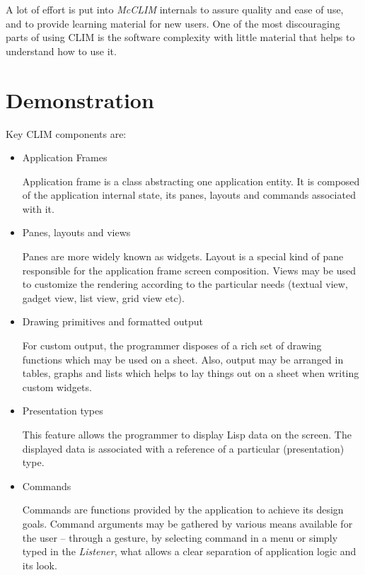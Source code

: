 \documentclass{sig-alternate-05-2015}
\begin{document}
A lot of effort is put into \emph{McCLIM} internals to assure quality
and ease of use, and to provide learning material for new users. One
of the most discouraging parts of using CLIM is the software
complexity with little material that helps to understand how to use
it.
\section{Demonstration}

Key CLIM components are:

\begin{itemize}
\item Application Frames

  Application frame is a class abstracting one application entity. It
  is composed of the application internal state, its panes, layouts
  and commands associated with it.

\item Panes, layouts and views

  Panes are more widely known as widgets. Layout is a special kind of
  pane responsible for the application frame screen composition. Views
  may be used to customize the rendering according to the particular
  needs (textual view, gadget view, list view, grid view etc).

\item Drawing primitives and formatted output

  For custom output, the programmer disposes of a rich set of drawing
  functions which may be used on a sheet. Also, output may be arranged
  in tables, graphs and lists which helps to lay things out on a sheet
  when writing custom widgets.

\item Presentation types

  This feature allows the programmer to display Lisp data on the
  screen.  The displayed data is associated with a reference of a
  particular (presentation) type.

\item Commands

  Commands are functions provided by the application to achieve its
  design goals. Command arguments may be gathered by various means
  available for the user – through a gesture, by selecting command in
  a menu or simply typed in the \emph{Listener}, what allows a clear
  separation of application logic and its look.
\end{itemize}
\end{document}
